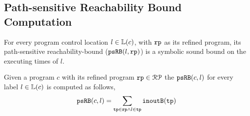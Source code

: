 \subsection{Path-sensitive Reachability Bound Computation}

For every program control location $l \in \mathbb{L}(c)$, with $\mathtt{rp}$ as its refined program,
its path-sensitive reachability-bound ($\mathtt{psRB}(l, \mathtt{rp})$) is a symbolic sound bound on the executing times of $l$.
 \begin{defn}
  \label{def:label_psrb}
Given a program $c$ with its refined program $\mathtt{rp} \in \mathcal{RP}$
the $\mathtt{psRB}(c, l)$ for every label $l \in \mathbb{L}(c)$ is computed as follows,
\\
\[ \mathtt{psRB}(c, l) = \sum\limits_{\mathtt{tp} \in \mathtt{rp} \land 
l \in \mathtt{tp}} \mathtt{inoutB}(\mathtt{tp})\]
 \end{defn}